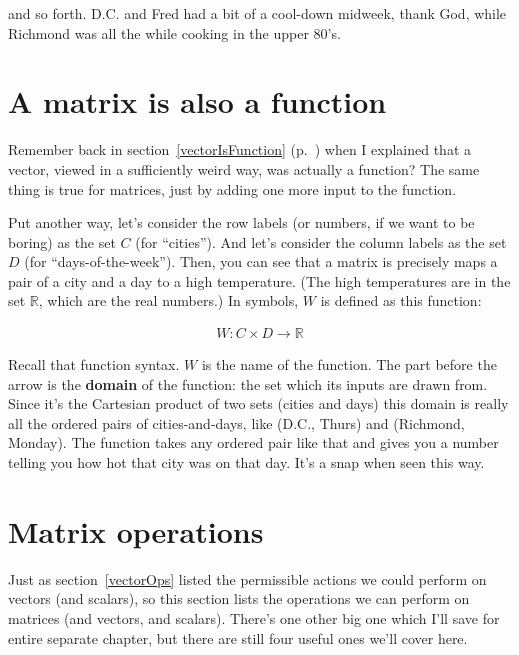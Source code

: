 and so forth. D.C. and Fred had a bit of a cool-down midweek, thank God, while
Richmond was all the while cooking in the upper 80's.

\section{A matrix is also a function}
\label{matrixIsFunction}
Remember back in section~\ref{vectorIsFunction} (p.~\pageref{vectorIsFunction})
when I explained that a vector, viewed in a sufficiently weird way, was
actually a function? The same thing is true for matrices, just by adding one
more input to the function.

Put another way, let's consider the row labels (or numbers, if we want to be
boring) as the set $C$ (for ``cities''). And let's consider the column labels
as the set $D$ (for ``days-of-the-week''). Then, you can see that a matrix is
precisely maps a pair of a city and a day to a high temperature. (The high
temperatures are in the set $\mathbb{R}$, which are the real numbers.) In
symbols, $W$ is defined as this function:

\vspace{-.15in}
\begin{align*}
W : C \times D \rightarrow \mathbb{R}
\end{align*}
\vspace{-.15in}

Recall that function syntax. $W$ is the name of the function. The part before
the arrow is the \textbf{domain} of the function: the set which its inputs are
drawn from. Since it's the Cartesian product of two sets (cities and days) this
domain is really all the ordered pairs of cities-and-days, like (D.C., Thurs)
and (Richmond, Monday). The function takes any ordered pair like that and gives
you a number telling you how hot that city was on that day. It's a snap when
seen this way.


\section{Matrix operations}

Just as section~\ref{vectorOps} listed the permissible actions we could perform
on vectors (and scalars), so this section lists the operations we can perform
on matrices (and vectors, and scalars). There's one other big one which I'll
save for entire separate chapter, but there are still four useful ones we'll
cover here.

